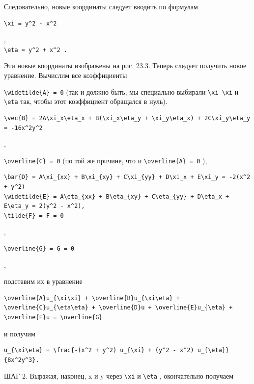 \documentclass[
  ukrainian,
]{article}
\begin{document}
Следовательно, новые координаты следует вводить по формулам

\begin{verbatim}
\xi = y^2 - x^2
\end{verbatim}

,\\
\texttt{\textquotesingle{}\textbackslash{}eta\ =\ y\^{}2\ +\ x\^{}2\textquotesingle{}\ .}

Эти новые координаты изображены на рис. 23.3. Теперь следует получить
новое уравнение. Вычислим все коэффициенты

\texttt{\textbackslash{}widetilde\{A\}\ =\ 0} (так и должно быть; мы
специально выбирали \texttt{\textbackslash{}xi\ \textbackslash{}xi} и
\texttt{\textbackslash{}eta} так, чтобы этот коэффициент обращался в
нуль).

\begin{verbatim}
\vec{B} = 2A\xi_x\eta_x + B(\xi_x\eta_y + \xi_y\eta_x) + 2C\xi_y\eta_y = -16x^2y^2
\end{verbatim}

,

\texttt{\textbackslash{}overline\{C\}\ =\ 0} (по той же причине, что и
\texttt{\textbackslash{}overline\{A\}\ =\ 0} ),

\begin{verbatim}
\bar{D} = A\xi_{xx} + B\xi_{xy} + C\xi_{yy} + D\xi_x + E\xi_y = -2(x^2 + y^2)
\widetilde{E} = A\eta_{xx} + B\eta_{xy} + C\eta_{yy} + D\eta_x + E\eta_y = 2(y^2 - x^2),
\tilde{F} = F = 0
\end{verbatim}

,

\begin{verbatim}
\overline{G} = G = 0
\end{verbatim}

,

подставим их в уравнение

\begin{verbatim}
\overline{A}u_{\xi\xi} + \overline{B}u_{\xi\eta} + \overline{C}u_{\eta\eta} + \overline{D}u + \overline{E}u_{\eta} + \overline{F}u = \overline{G}
\end{verbatim}

и получим

\begin{verbatim}
u_{\xi\eta} = \frac{-(x^2 + y^2) u_{\xi} + (y^2 - x^2) u_{\eta}}{8x^2y^3}.
\end{verbatim}

ШАГ 2. Выражая, наконец, x и y через \texttt{\textbackslash{}xi} и
\texttt{\textbackslash{}eta} , окончательно получаем
\end{document}
